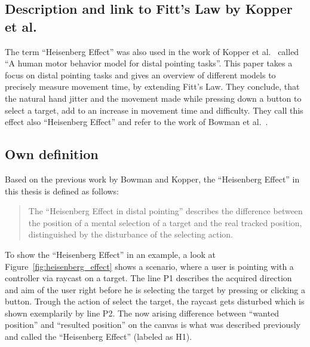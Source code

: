 \subsection{Description and link to Fitt's Law by Kopper et al.}
\label{subsec:related-work:defining-heisenberg-effect:description}

The term ``Heisenberg Effect'' was also used in the work of Kopper et al.~\cite{kopper_human_2010} called ``A human motor behavior model for distal pointing tasks''. This paper takes a focus on distal pointing tasks and gives an overview of different models to precisely measure movement time, by extending Fitt's Law. They conclude, that the natural hand jitter and the movement made while pressing down a button to select a target, add to an increase in movement time and difficulty. They call this effect also ``Heisenberg Effect'' and refer to the work of Bowman et al.~\cite{bowman_using_2001}.

\subsection{Own definition}
\label{subsec:related-work:defining-heisenberg-effect:definition}

Based on the previous work by Bowman and Kopper, the ``Heisenberg Effect'' in this thesis is defined as follows:

\begin{quote}
The ``Heisenberg Effect in distal pointing'' describes the difference between the position of a mental selection of a target and the real tracked position, distinguished by the disturbance of the selecting action.
\end{quote}

To show the ``Heisenberg Effect'' in an example, a look at Figure~\ref{fig:heisenberg_effect} shows a 
scenario, where a user is pointing with a controller via raycast on a target. The line P1 describes the acquired direction and aim of the user right before he is selecting the target by pressing or clicking a button. Trough the action of select the target, the raycast gets disturbed which is shown exemplarily by line P2. The now arising difference between ``wanted position'' and ``resulted position'' on the canvas is what was described previously and called the ``Heisenberg Effect'' (labeled as H1).

